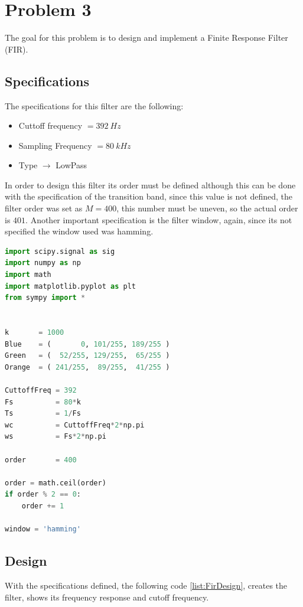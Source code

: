 \section{Problem 3}

The goal for this problem is to design and implement a Finite Response Filter (FIR).

\subsection{Specifications}

The specifications for this filter are the following:
\begin{itemize}
    \item Cuttoff frequency  $= 392~Hz$
    \item Sampling Frequency $= 80~kHz$
    \item Type $\rightarrow$ LowPass
\end{itemize}

In order to design this filter its order must be defined although this can be done with the specification of the transition band, since this value is not defined, the filter order was set as $M = 400$, this number must be uneven, so the actual order is $401$. Another important specification is the filter window, again, since its not specified the window used was hamming.
\vspace{1cm}
\begin{lstlisting}[language=python, caption = Specification Definition]
import scipy.signal as sig
import numpy as np
import math
import matplotlib.pyplot as plt 
from sympy import *


k       = 1000
Blue    = (       0, 101/255, 189/255 )
Green   = (  52/255, 129/255,  65/255 )
Orange  = ( 241/255,  89/255,  41/255 )

CuttoffFreq = 392
Fs          = 80*k
Ts          = 1/Fs
wc          = CuttoffFreq*2*np.pi
ws          = Fs*2*np.pi 

order       = 400

order = math.ceil(order)
if order % 2 == 0:
    order += 1

window = 'hamming'
\end{lstlisting}

\subsection{Design}

With the specifications defined, the following code \ref{list:FirDesign}, creates the filter, shows its frequency response and cutoff frequency.

